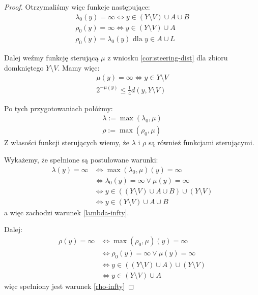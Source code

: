 \begin{lem}
\begin{proof}
    Otrzymaliśmy więc funkcje następujące:
    \begin{gather}
      \lambda_0(y) = \infty \Leftrightarrow y \in (Y \setminus V) \cup A \cup B \\
      \rho_0(y) = \infty \Leftrightarrow y \in (Y \setminus V) \cup A \\
      \label{rho0-eq-lambda0} \rho_0(y) = \lambda_0(y) \mbox{ dla } y \in A \cup L
    \end{gather}
    
    Dalej weźmy funkcję sterującą $\mu$ z wniosku \ref{cor:steering-dist} dla zbioru domkniętego $Y \setminus V$. Mamy więc:
    \begin{gather}
      \mu(y) = \infty \Leftrightarrow y \in Y \setminus V \\
      2^{-\mu(y)} \leq \frac{1}{4} d(y, Y \setminus V)
    \end{gather}
    
    Po tych przygotowaniach połóżmy:
    \begin{gather*}
      \lambda := \max(\lambda_0, \mu) \\
      \rho := \max(\rho_0, \mu)
    \end{gather*}
    Z własości funkcji sterujących wiemy, że $\lambda$ i $\rho$ są również funkcjami sterującymi.
    
    Wykażemy, że spełnione są postulowane warunki:
    \begin{align*}
     \lambda(y) = \infty & \Leftrightarrow \max(\lambda_0, \mu)(y) = \infty \\
     & \Leftrightarrow \lambda_0(y) = \infty \vee \mu(y) = \infty \\
     & \Leftrightarrow y \in ((Y \setminus V) \cup A \cup B) \cup (Y \setminus V) \\
     & \Leftrightarrow y \in (Y \setminus V) \cup A \cup B
    \end{align*}
    a więc zachodzi warunek \eqref{lambda-infty}.
    
    Dalej:
    \begin{align*}
      \rho(y) = \infty & \Leftrightarrow \max(\rho_0, \mu)(y) = \infty \\
      & \Leftrightarrow \rho_0(y) = \infty \vee \mu(y) = \infty \\
      & \Leftrightarrow y \in ((Y \setminus V) \cup A) \cup (Y \setminus V) \\
      & \Leftrightarrow y \in (Y \setminus V) \cup A
    \end{align*}
    więc spełniony jest warunek \eqref{rho-infty}
    

\end{proof}
\end{lem}
